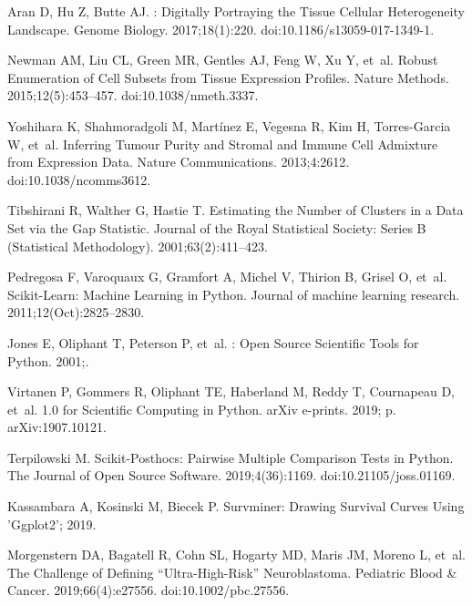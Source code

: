 \documentclass[10pt,letterpaper]{article}
\begin{document}
\begin{thebibliography}{10}
Aran D, Hu Z, Butte AJ.
: Digitally Portraying the Tissue Cellular Heterogeneity
Landscape.
\newblock Genome Biology. 2017;18(1):220.
\newblock doi:{10.1186/s13059-017-1349-1}.

Newman AM, Liu CL, Green MR, Gentles AJ, Feng W, Xu Y, et~al.
\newblock Robust Enumeration of Cell Subsets from Tissue Expression Profiles.
\newblock Nature Methods. 2015;12(5):453--457.
\newblock doi:{10.1038/nmeth.3337}.

Yoshihara K, Shahmoradgoli M, Mart{\'i}nez E, Vegesna R, Kim H, {Torres-Garcia}
W, et~al.
\newblock Inferring Tumour Purity and Stromal and Immune Cell Admixture from
Expression Data.
\newblock Nature Communications. 2013;4:2612.
\newblock doi:{10.1038/ncomms3612}.

Tibshirani R, Walther G, Hastie T.
\newblock Estimating the Number of Clusters in a Data Set via the Gap
Statistic.
\newblock Journal of the Royal Statistical Society: Series B (Statistical
Methodology). 2001;63(2):411--423.

Pedregosa F, Varoquaux G, Gramfort A, Michel V, Thirion B, Grisel O, et~al.
\newblock Scikit-Learn: Machine Learning in Python.
\newblock Journal of machine learning research. 2011;12(Oct):2825--2830.

Jones E, Oliphant T, Peterson P, et~al.
: {{Open}} Source Scientific Tools for {{Python}}. 2001;.

Virtanen P, Gommers R, Oliphant TE, Haberland M, Reddy T, Cournapeau D, et~al.
 1.0 for {{Scientific
		Computing}} in {{Python}}.
\newblock arXiv e-prints. 2019; p. arXiv:1907.10121.

Terpilowski M.
\newblock Scikit-Posthocs: {{Pairwise}} Multiple Comparison Tests in
{{Python}}.
\newblock The Journal of Open Source Software. 2019;4(36):1169.
\newblock doi:{10.21105/joss.01169}.

Kassambara A, Kosinski M, Biecek P.
\newblock Survminer: Drawing Survival Curves Using 'Ggplot2'; 2019.

Morgenstern DA, Bagatell R, Cohn SL, Hogarty MD, Maris JM, Moreno L, et~al.
\newblock The Challenge of Defining ``Ultra-High-Risk'' Neuroblastoma.
\newblock Pediatric Blood \& Cancer. 2019;66(4):e27556.
\newblock doi:{10.1002/pbc.27556}.


\end{thebibliography}
\end{document}
